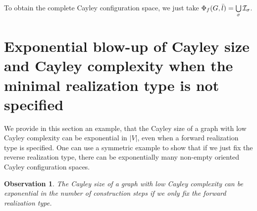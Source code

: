 \documentclass[secthm,amsthm,english]{article}
\newtheorem{observation}{Observation}
\theoremstyle{definition}
\theoremstyle{remark}
\begin{document}
\noindent To obtain the complete Cayley configuration space, we just take $\Phi_{f}(G,\bar{l})=\bigcup\limits _{\sigma}{\cal I}_{\sigma}$.

\section{Exponential blow-up of Cayley size and Cayley complexity when the minimal realization type is not specified}
\label{sec:Exponential}

We provide in this section an example, 
that the Cayley size of a graph with low Cayley complexity can be exponential in $|V|$, 
even when a forward realization type is specified. 
One can use a symmetric example to show that if we just fix the reverse realization type, there can be exponentially many non-empty oriented Cayley configuration spaces. 

\begin{observation} \label{obs:interval-expo} 
The Cayley size of a graph with low Cayley complexity can be exponential
in the number of construction steps if we only fix the forward realization type.
\end{observation}
\end{document}
